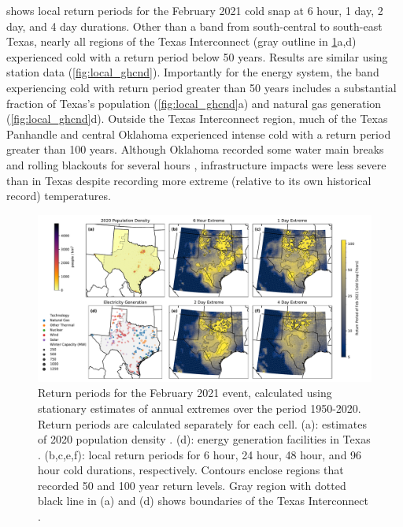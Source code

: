 \documentclass[12pt]{iopart}
\begin{document}
 shows local return periods for the February 2021 cold snap at 6 hour, 1 day, 2 day, and 4 day durations.
Other than a band from south-central to south-east Texas, nearly all regions of the Texas Interconnect (gray outline in \cref{fig:local_era5}a,d) experienced cold with a return period below 50 years.
Results are similar using station data (\cref{fig:local_ghcnd}).
Importantly for the energy system, the band experiencing cold with return period greater than 50 years includes a substantial fraction of Texas’s population (\cref{fig:local_ghcnd}a) and natural gas generation (\cref{fig:local_ghcnd}d).
Outside the Texas Interconnect region, much of the Texas Panhandle and central Oklahoma experienced intense cold with a return period greater than 100 years.
Although Oklahoma recorded some water main breaks \cite{crum_water:2021} and rolling blackouts for several hours \cite{money_oklahoma:2021}, infrastructure impacts were less severe than in Texas despite recording more extreme (relative to its own historical record) temperatures.

\begin{figure}
  \centering
  \includegraphics[width=\textwidth]{local_rt_era5.pdf}
  \caption{
    Return periods for the February 2021 event, calculated using stationary estimates of annual extremes over the period 1950-2020.
    Return periods are calculated separately for each cell.
    (a): estimates of 2020 population density \cite{ciesin_gpwv4:2016}.
    (d): energy generation facilities in Texas \cite{useia_generators:2021}.
    (b,c,e,f): local return periods for 6 hour, 24 hour, 48 hour, and 96 hour cold durations, respectively.
    Contours enclose regions that recorded 50 and 100 year return levels.
    Gray region with dotted black line in (a) and (d) shows boundaries of the Texas Interconnect \cite{useia_regions:2021}.
  }\label{fig:local_era5}
\end{figure}
\end{document}
